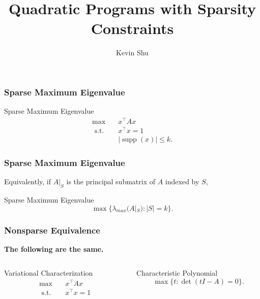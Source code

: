 \documentclass{beamer}
\title{Quadratic Programs with Sparsity Constraints}
\author{Kevin Shu\inst{1}}
\institute{\inst{1} Georgia Institute of Technology}
\date{}
\DeclareMathOperator*{\supp}{supp}
\newcommand{\st}{{\text{ s.t. }}}
\begin{document}
\frame{\titlepage}
\begin{frame}
    \frametitle{Sparse Maximum Eigenvalue}
    \begin{block}{Sparse Maximum Eigenvalue}
        \begin{equation*}
            \begin{aligned}
                \max\quad & x^{\intercal}Ax\\
                \st & x^{\intercal}x = 1\\
                    &|\supp(x)| \le k.
            \end{aligned}
        \end{equation*}
    \end{block}
\end{frame}
\begin{frame}
    \frametitle{Sparse Maximum Eigenvalue}
    Equivalently, if $A|_S$ is the principal submatrix of $A$ indexed by $S$,
    \begin{block}{Sparse Maximum Eigenvalue}
        \[\max \{ \lambda_{max}(A|_S) : |S| = k\}.\]
    \end{block}
\end{frame}
\begin{frame}
    \frametitle{Nonsparse Equivalence}
    \textbf{The following are the same.}
    \vspace{0.3in}
    \begin{columns}
        \begin{column}{0.48\textwidth}
            \begin{block}{Variational Characterization}
            \begin{equation*}
                \begin{aligned}
                    \max\quad & x^{\intercal}Ax\\
                    \st & x^{\intercal}x = 1\\
                \end{aligned}
            \end{equation*}
            \end{block}
        \end{column}
        \pause
        \begin{column}{0.48\textwidth}
            \begin{block}{Characteristic Polynomial}
            \[
                \max \{t : \det(tI - A) = 0\}.
            \]
            \end{block}
        \end{column}
    \end{columns}
\end{frame}
\end{document}
